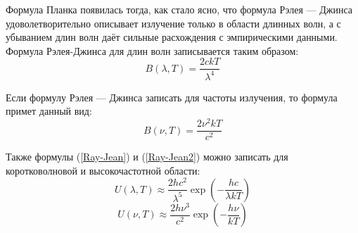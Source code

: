 Формула Планка появилась тогда, как стало ясно, что формула Рэлея — Джинса удоволетворительно описывает излучение только в области длинных волн, а с убыванием длин волн даёт сильные расхождения с эмпирическими данными. Формула Рэлея-Джинса для длин волн записывается таким образом:
\begin{equation}\label{Ray-Jean}
B(\lambda,T)=\frac{2ckT}{\lambda^4}
\end{equation}

Если формулу Рэлея — Джинса записать для частоты излучения, то формула примет данный вид:
\begin{equation}\label{Ray-Jean2}
B(\nu,T)=\frac{2\nu^2 kT}{c^2}
\end{equation}

Также формулы (\ref{Ray-Jean}) и (\ref{Ray-Jean2}) можно записать для коротковолновой и высокочастотной области:
\begin{equation}
U(\lambda,T)\approx\frac{2hc^2}{\lambda^5}\exp\left(-\frac{hc}{\lambda kT}\right)
\end{equation}
\begin{equation}
U(\nu,T)\approx\frac{2h\nu^3}{c^2}\exp\left(-\frac{h\nu}{kT}\right)
\end{equation}